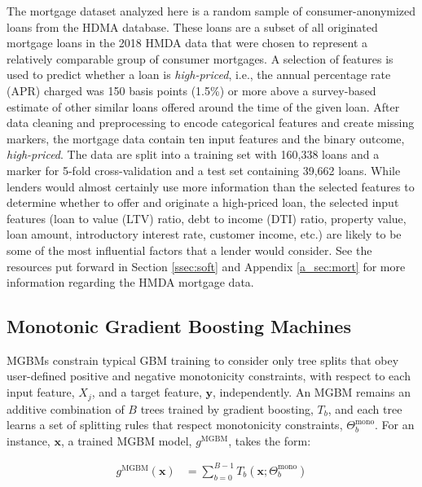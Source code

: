 \documentclass[information,article,accept,moreauthors,pdftex]{Definitions/mdpi}
\begin{document}
The mortgage dataset analyzed here is a random sample of consumer-anonymized loans from the HDMA database. These loans are a subset of all originated mortgage loans in the 2018 HMDA data that were chosen to represent a relatively comparable group of consumer mortgages.  A selection of features is used to predict whether a loan is \textit{high-priced}, i.e., the annual percentage rate (APR) charged was 150 basis points (1.5\%) or more above a survey-based estimate of other similar loans offered around the time of the given loan.  After data cleaning and preprocessing to encode categorical features and create missing markers, the mortgage data contain ten input features and the binary outcome, \textit{high-priced}. The data are split into a training set with 160,338 loans and a marker for 5-fold cross-validation and a test set containing 39,662 loans. While lenders would almost certainly use more information than the selected features to determine whether to offer and originate a high-priced loan, the selected input features (loan to value (LTV) ratio, debt to income (DTI) ratio, property value, loan amount, introductory interest rate, customer income, etc.) are likely to be some of the most influential factors that a lender would consider. See the resources put forward in Section \ref{ssec:soft} and Appendix \ref{a_sec:mort} for more information regarding the HMDA mortgage data.

\subsection{Monotonic Gradient Boosting Machines}\label{ssec:mgbm}

MGBMs constrain typical GBM training to consider only tree splits that obey user-defined positive and negative monotonicity constraints, with respect to each input feature, $X_j$, and a target feature, $\mathbf{y}$, independently. An MGBM remains an additive combination of $B$ trees trained by gradient boosting, $T_b$, and each tree learns a set of splitting rules that respect monotonicity constraints,  $\Theta^\text{mono}_b$. For an instance, $\mathbf{x}$, a trained MGBM model, $g^{\text{MGBM}}$, takes the form:

\begin{equation}
\begin{aligned}\label{eq:gbm}
g^{\text{MGBM}}(\mathbf{x}) &= \sum_{b=0}^{B-1} T_b\left(\mathbf{x}; \Theta^\text{mono}_b\right)
\end{aligned}
\end{equation}
\end{document}

